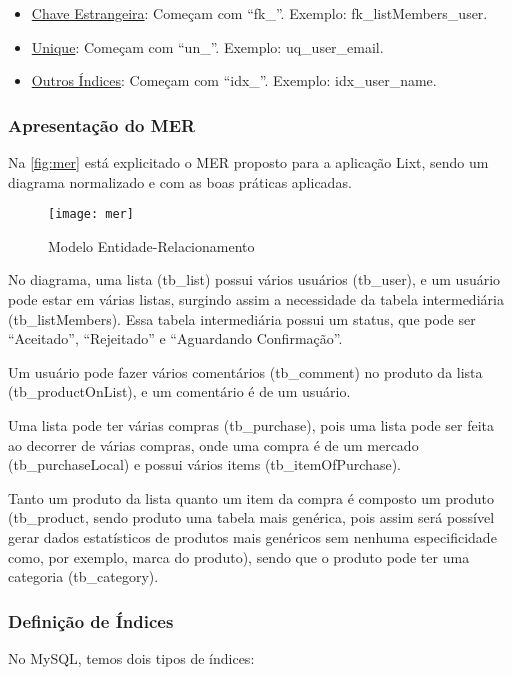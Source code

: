 \begin{itemize}
	\item \underline{Chave Estrangeira}: Começam com ``fk\_''. Exemplo: fk\_listMembers\_user. 
	\item \underline{Unique}: Começam com ``un\_''. Exemplo: uq\_user\_email.
	\item \underline{Outros Índices}: Começam com ``idx\_''. Exemplo: idx\_user\_name. 
\end{itemize}


\subsubsection{Apresentação do MER}

Na \autoref{fig:mer} está explicitado o MER proposto para a aplicação Lixt, sendo um diagrama normalizado e com as boas práticas aplicadas.

\begin{figure}[H]
  \centering
  \caption{Modelo Entidade-Relacionamento}
  \label{fig:mer}
  \texttt{[image: mer]}
\end{figure}

No diagrama, uma lista (tb\_list) possui vários usuários (tb\_user), e um usuário pode estar em várias listas, surgindo assim a necessidade da tabela intermediária (tb\_listMembers). Essa tabela intermediária possui um status, que pode ser ``Aceitado'', ``Rejeitado'' e ``Aguardando Confirmação''.

Um usuário pode fazer vários comentários (tb\_comment) no produto da lista (tb\_productOnList), e um comentário é de um usuário.

Uma lista pode ter várias compras (tb\_purchase), pois uma lista pode ser feita ao decorrer de várias compras, onde uma compra é de um mercado (tb\_purchaseLocal) e possui vários items (tb\_itemOfPurchase).

Tanto um produto da lista quanto um item da compra é 
composto um produto (tb\_product, sendo produto uma tabela mais genérica, pois assim será possível gerar dados estatísticos de produtos mais genéricos sem nenhuma especificidade como, por exemplo, marca do produto), sendo que o produto pode ter uma categoria (tb\_category).

\subsubsection{Definição de Índices}

No MySQL, temos dois tipos de índices:

